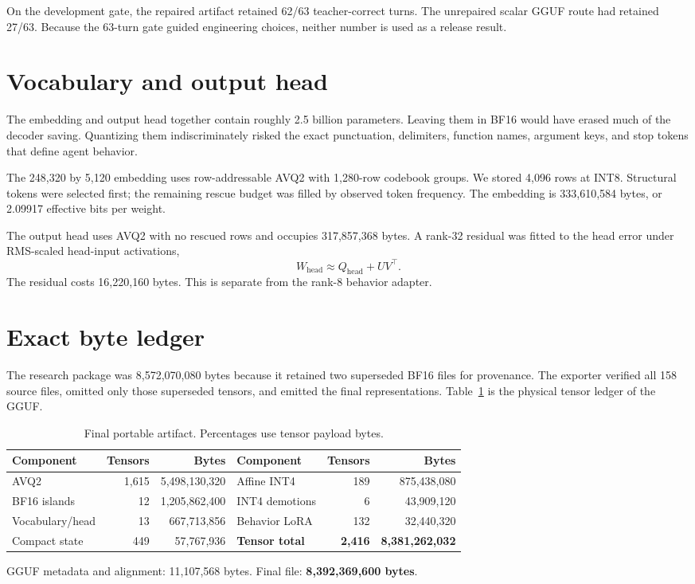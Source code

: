 \documentclass[10pt,twocolumn]{article}
\begin{document}
On the development gate, the repaired artifact retained 62/63 teacher-correct turns. The unrepaired scalar GGUF route had retained 27/63. Because the 63-turn gate guided engineering choices, neither number is used as a release result.

\section{Vocabulary and output head}

The embedding and output head together contain roughly 2.5 billion parameters. Leaving them in BF16 would have erased much of the decoder saving. Quantizing them indiscriminately risked the exact punctuation, delimiters, function names, argument keys, and stop tokens that define agent behavior.

The 248,320 by 5,120 embedding uses row-addressable AVQ2 with 1,280-row codebook groups. We stored 4,096 rows at INT8. Structural tokens were selected first; the remaining rescue budget was filled by observed token frequency. The embedding is 333,610,584 bytes, or 2.09917 effective bits per weight.

The output head uses AVQ2 with no rescued rows and occupies 317,857,368 bytes. A rank-32 residual was fitted to the head error under RMS-scaled head-input activations,
\begin{equation}
W_{\mathrm{head}} \approx Q_{\mathrm{head}} + UV^\top.
\end{equation}
The residual costs 16,220,160 bytes. This is separate from the rank-8 behavior adapter.

\section{Exact byte ledger}

The research package was 8,572,070,080 bytes because it retained two superseded BF16 files for provenance. The exporter verified all 158 source files, omitted only those superseded tensors, and emitted the final representations. Table~\ref{tab:bytes} is the physical tensor ledger of the GGUF.

\begin{table}[t]
\centering
\small
\caption{Final portable artifact. Percentages use tensor payload bytes.}
\label{tab:bytes}
\begin{tabular}{lrrlrr}
\toprule
Component & Tensors & Bytes & Component & Tensors & Bytes \\
\midrule
AVQ2 & 1,615 & 5,498,130,320 & Affine INT4 & 189 & 875,438,080 \\
BF16 islands & 12 & 1,205,862,400 & INT4 demotions & 6 & 43,909,120 \\
Vocabulary/head & 13 & 667,713,856 & Behavior LoRA & 132 & 32,440,320 \\
Compact state & 449 & 57,767,936 & \textbf{Tensor total} & \textbf{2,416} & \textbf{8,381,262,032} \\
\bottomrule
\end{tabular}
\vspace{1mm}

GGUF metadata and alignment: 11,107,568 bytes. Final file: \textbf{8,392,369,600 bytes}.
\end{table}
\end{document}
